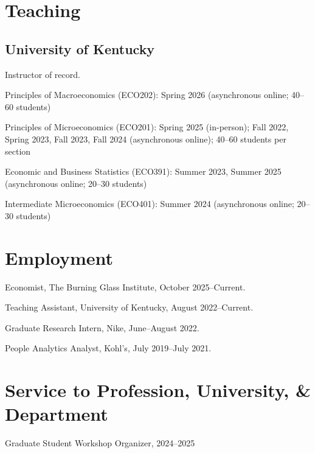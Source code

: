 \documentclass[letterpaper]{article}
\renewenvironment{itemize}{
  \begin{list}{}{
    \setlength{\leftmargin}{1.5em}
  }
}{
  \end{list}
}
\begin{document}
\section*{Teaching}

\subsection*{University of Kentucky}

Instructor of record.

\begin{itemize}
\item Principles of Macroeconomics (ECO202): Spring 2026 (asynchronous online; 40--60 students)

\item Principles of Microeconomics (ECO201): Spring 2025 (in-person); Fall 2022, Spring 2023, Fall 2023, Fall 2024 (asynchronous online); 40--60 students per section

\item Economic and Business Statistics (ECO391): Summer 2023, Summer 2025 (asynchronous online; 20--30 students)

\item Intermediate Microeconomics (ECO401): Summer 2024 (asynchronous online; 20--30 students)


\end{itemize}

\section*{Employment}

\begin{itemize}
\item Economist, The Burning Glass Institute, October 2025--Current.
\item Teaching Assistant, University of Kentucky, August 2022--Current.
\item Graduate Research Intern, Nike, June--August 2022.
\item People Analytics Analyst, Kohl's, July 2019--July 2021.
\end{itemize}

\section*{Service to Profession, University, \& Department}

\begin{itemize}
\item Graduate Student Workshop Organizer, 2024--2025
\end{itemize}
\end{document}
